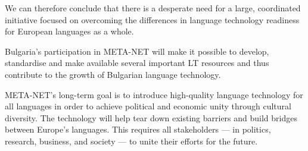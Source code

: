 \begin{multicols}{2}
We can therefore conclude that there is a desperate need for a large, coordinated initiative focused on overcoming the differences in language technology readiness for European languages as a whole. 

Bulgaria’s participation in
META-NET will make it possible to develop, standardise and make
available several important LT resources and thus contribute to the
growth of Bulgarian language technology.

META-NET’s long-term goal is to introduce high-quality language technology for all languages in order to achieve political and economic unity through cultural diversity. The technology will help tear down existing barriers and build bridges between Europe’s languages. This requires all stakeholders — in politics, research, business, and society — to unite their efforts for the future.
\end{multicols}

\clearpage


